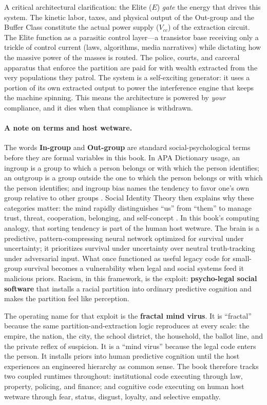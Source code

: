 \documentclass[12pt,openany]{book}
\numberwithin{equation}{chapter}
\begin{document}
A critical architectural clarification: the Elite ($E$) \textit{gate} the energy that drives this system. The kinetic labor, taxes, and physical output of the Out-group and the Buffer Class constitute the actual power supply ($V_{cc}$) of the extraction circuit. The Elite function as a parasitic control layer---a transistor base receiving only a trickle of control current (laws, algorithms, media narratives) while dictating how the massive power of the masses is routed. The police, courts, and carceral apparatus that enforce the partition are paid for with wealth extracted from the very populations they patrol. The system is a self-exciting generator: it uses a portion of its own extracted output to power the interference engine that keeps the machine spinning. This means the architecture is powered by \textit{your} compliance, and it dies when that compliance is withdrawn.

\paragraph{A note on terms and host wetware.}
The words \textbf{In-group} and \textbf{Out-group} are standard social-psychological terms before they are formal variables in this book. In APA Dictionary usage, an ingroup is a group to which a person belongs or with which the person identifies; an outgroup is a group outside the one to which the person belongs or with which the person identifies; and ingroup bias names the tendency to favor one's own group relative to other groups \cite{apa_dictionary_ingroup,apa_dictionary_outgroup,apa_dictionary_ingroup_bias}. Social Identity Theory then explains why these categories matter: the mind rapidly distinguishes ``us'' from ``them'' to manage trust, threat, cooperation, belonging, and self-concept \cite{tajfel_turner_intergroup_conflict_1979}. In this book's computing analogy, that sorting tendency is part of the human host wetware. The brain is a predictive, pattern-compressing neural network optimized for survival under uncertainty; it prioritizes survival under uncertainty over neutral truth-tracking under adversarial input. What once functioned as useful legacy code for small-group survival becomes a vulnerability when legal and social systems feed it malicious priors. Racism, in this framework, is the exploit: \textbf{psycho-legal social software} that installs a racial partition into ordinary predictive cognition and makes the partition feel like perception.

The operating name for that exploit is the \textbf{fractal mind virus}. It is ``fractal'' because the same partition-and-extraction logic reproduces at every scale: the empire, the nation, the city, the school district, the household, the ballot line, and the private reflex of suspicion. It is a ``mind virus'' because the legal code enters the person. It installs priors into human predictive cognition until the host experiences an engineered hierarchy as common sense. The book therefore tracks two coupled runtimes throughout: institutional code executing through law, property, policing, and finance; and cognitive code executing on human host wetware through fear, status, disgust, loyalty, and selective empathy.
\end{document}
